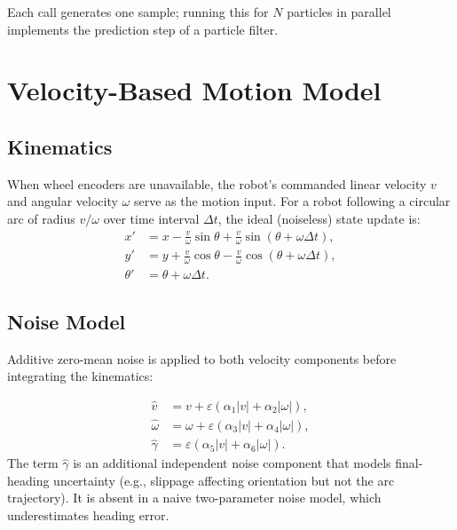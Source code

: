 \documentclass[11pt,a4paper]{article}
\theoremstyle{definition}
\theoremstyle{plain}
\theoremstyle{remark}
\begin{document}
Each call generates one sample; running this for $N$ particles in parallel implements the prediction step of a particle filter.

\section{Velocity-Based Motion Model}

\subsection{Kinematics}

When wheel encoders are unavailable, the robot's commanded linear velocity $v$ and angular velocity $\omega$ serve as the motion input. For a robot following a circular arc of radius $v/\omega$ over time interval $\Delta t$, the ideal (noiseless) state update is:
\begin{align*}
    x'      &= x - \frac{v}{\omega}\sin\theta + \frac{v}{\omega}\sin(\theta + \omega\Delta t), \\
    y'      &= y + \frac{v}{\omega}\cos\theta - \frac{v}{\omega}\cos(\theta + \omega\Delta t), \\
    \theta' &= \theta + \omega\Delta t.
\end{align*}

\subsection{Noise Model}

Additive zero-mean noise is applied to both velocity components before integrating the kinematics:

\begin{tcolorbox}[colback=blue!5!white,colframe=blue!75!black,title=\textbf{Velocity Noise Model}]
\begin{align*}
    \hat{v}      &= v + \varepsilon(\alpha_1|v| + \alpha_2|\omega|), \\
    \hat{\omega} &= \omega + \varepsilon(\alpha_3|v| + \alpha_4|\omega|), \\
    \hat{\gamma} &= \varepsilon(\alpha_5|v| + \alpha_6|\omega|).
\end{align*}
The term $\hat{\gamma}$ is an additional independent noise component that models final-heading uncertainty (e.g., slippage affecting orientation but not the arc trajectory). It is absent in a naive two-parameter noise model, which underestimates heading error.
\end{tcolorbox}
\end{document}
